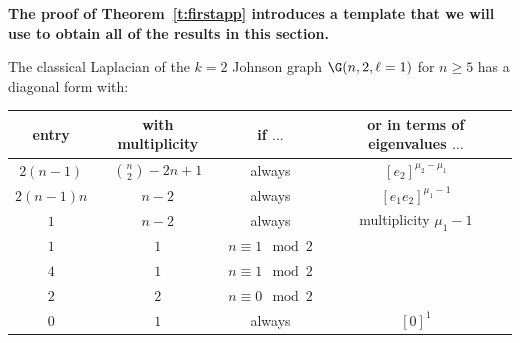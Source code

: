 \medskip
{\bf The proof of Theorem~\ref{t:firstapp} introduces a template that we will use to obtain all of the results in this section.}

\begin{theorem}\label{t:firstapp}
The classical Laplacian of the $k=2$ Johnson graph $\G(n, 2, \ell = 1)$ for $n \geq 5$ has a diagonal form with:
\begin{center}
\begin{tabular}{ |c|c|c||c| } 
 \hline
 entry & with multiplicity & if $\ldots$ & or in terms of eigenvalues $\ldots$ \\ 
 \hline
$2(n-1)$ & $\binom{n}{2} - 2n + 1$ & always & $[e_2]^{\mu_2 - \mu_1}$ \\

$2(n - 1)n$ & $n - 2$ & always & $[e_1 e_2]^{\mu_1 - 1}$ \\
$1$ & $n - 2$ & always & multiplicity $\mu_1-1$ \\

$1$ & $1$ & $n \equiv 1 \mod 2$ & \\
$4$ & $1$ & $n \equiv 1 \mod 2$ & \\

$2$ & $2$ & $n \equiv 0 \mod 2$ & \\

$0$ & $1$ & always & $[0]^1$ \\
 \hline
\end{tabular}
\end{center}
\end{theorem}
